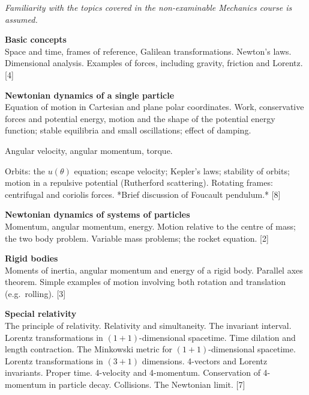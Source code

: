 \documentclass[a4paper]{article}
\begin{document}
\maketitle
{\small
\noindent\emph{Familiarity with the topics covered in the non-examinable Mechanics course is assumed.}
\vspace{10pt}

\noindent\textbf{Basic concepts}\\
Space and time, frames of reference, Galilean transformations. Newton's laws. Dimensional analysis. Examples of forces, including gravity, friction and Lorentz.\hspace*{\fill} [4]

\vspace{10pt}
\noindent\textbf{Newtonian dynamics of a single particle}\\
Equation of motion in Cartesian and plane polar coordinates. Work, conservative forces and potential energy, motion and the shape of the potential energy function; stable equilibria and small oscillations; effect of damping.

\vspace{5pt}
\noindent Angular velocity, angular momentum, torque.

\vspace{5pt}
\noindent Orbits: the $u(\theta)$ equation; escape velocity; Kepler's laws; stability of orbits; motion in a repulsive potential (Rutherford scattering). Rotating frames: centrifugal and coriolis forces. *Brief discussion of Foucault pendulum.*\hspace*{\fill} [8]

\vspace{10pt}
\noindent\textbf{Newtonian dynamics of systems of particles}\\
Momentum, angular momentum, energy. Motion relative to the centre of mass; the two body problem. Variable mass problems; the rocket equation.\hspace*{\fill} [2]

\vspace{10pt}
\noindent\textbf{Rigid bodies}\\
Moments of inertia, angular momentum and energy of a rigid body. Parallel axes theorem. Simple examples of motion involving both rotation and translation (e.g.\ rolling).\hspace*{\fill} [3]

\vspace{10pt}
\noindent\textbf{Special relativity}\\
The principle of relativity. Relativity and simultaneity. The invariant interval. Lorentz transformations in $(1 + 1)$-dimensional spacetime. Time dilation and length contraction. The Minkowski metric for $(1 + 1)$-dimensional spacetime. Lorentz transformations in $(3 + 1)$ dimensions. 4-vectors and Lorentz invariants. Proper time. 4-velocity and 4-momentum. Conservation of 4-momentum in particle decay. Collisions. The Newtonian limit.\hspace*{\fill} [7]}
\end{document}
